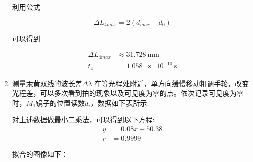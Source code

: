 \documentclass[a4paper]{article}
\begin{document}
\begin{changemargin}{1cm}{1cm}
\begin{spacing}{1.6}
\begin{enumerate}
                  利用公式

                  $$\Delta L_{4max}=2(d_{max}-d_0)$$

                  可以得到

                  $$\begin{aligned}
                          \Delta L_{4max} & \approx \SI{31.728}{\mm} \\
                          t_4             & =\SI{1.058e-10}{\s}
                      \end{aligned}$$

            \item 测量汞黄双线的波长差$\Delta\lambda$
                  在等光程处附近，单方向缓慢移动粗调手轮，改变光程差，可以多次看到拍的现象以及可见度为零的点。依次记录可见度为零时，$M_1$镜子的位置读数$d_i$，数据如下表所示:

                  \begin{table}[htbp]
                      \centering
                      \captionsetup{justification=centering,margin=2cm}
                      \caption{\label{tab:tab_data2}衬比度为最低时位置实验数据表}
                  \end{table}\par

                  对上述数据做最小二乘法，可以得到以下方程:
                  $$\begin{aligned}
                          y & = 0.08x+50.38 \\
                          r & =0.9999
                      \end{aligned}$$

                  拟合的图像如下：


\end{enumerate}
\end{spacing}
\end{changemargin}
\end{document}
